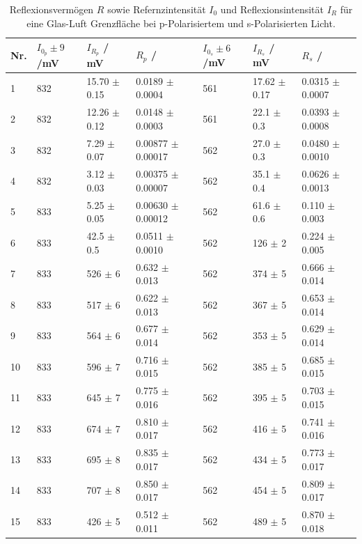 \documentclass[12pt,a4paper,twoside]{article}
\begin{document}
\begin{table}[H]
    \centering
    \caption{Reflexionsvermögen $R$ sowie Refernzintensität $I_0$ und Reflexionsintensität $I_R$ für eine Glas-Luft Grenzfläche bei p-Polarisiertem und s-Polarisierten Licht.}
    \label{tab:reflexionsvermögen glas luft}
    \begin{tabular}{| l | l | l | l | l | l | l |}
        \hline
        Nr. & $I_{0_p} \pm 9$/mV & $I_{R_p}$ / mV & $R_p$ /  & $I_{0_s} \pm 6$/mV & $I_{R_s}$ / mV & $R_s$ / \\
        \hline
        1  & 832  & 15.70 $\pm$ 0.15    & 0.0189      $\pm$ 0.0004     & 561 & 17.62   $\pm$ 0.17  & 0.0315  $\pm$ 0.0007 \\
        2  & 832  & 12.26 $\pm$ 0.12    & 0.0148      $\pm$ 0.0003     & 561 & 22.1    $\pm$ 0.3   & 0.0393  $\pm$ 0.0008 \\
        3  & 832  & 7.29  $\pm$ 0.07    & 0.00877     $\pm$ 0.00017    & 562 & 27.0    $\pm$ 0.3   & 0.0480  $\pm$ 0.0010 \\
        4  & 832  & 3.12  $\pm$ 0.03    & 0.00375     $\pm$ 0.00007    & 562 & 35.1    $\pm$ 0.4   & 0.0626  $\pm$ 0.0013 \\
        5  & 833  & 5.25  $\pm$ 0.05    & 0.00630     $\pm$ 0.00012    & 562 & 61.6    $\pm$ 0.6   & 0.110   $\pm$ 0.003  \\
        6  & 833  & 42.5  $\pm$ 0.5     & 0.0511      $\pm$ 0.0010     & 562 & 126     $\pm$ 2     & 0.224   $\pm$ 0.005  \\
        7  & 833  & 526   $\pm$ 6       & 0.632       $\pm$ 0.013      & 562 & 374     $\pm$ 5     & 0.666   $\pm$ 0.014  \\
        8  & 833  & 517   $\pm$ 6       & 0.622       $\pm$ 0.013      & 562 & 367     $\pm$ 5     & 0.653   $\pm$ 0.014  \\
        9  & 833  & 564   $\pm$ 6       & 0.677       $\pm$ 0.014      & 562 & 353     $\pm$ 5     & 0.629   $\pm$ 0.014  \\
        10 & 833  & 596   $\pm$ 7       & 0.716       $\pm$ 0.015      & 562 & 385     $\pm$ 5     & 0.685   $\pm$ 0.015  \\
        11 & 833  & 645   $\pm$ 7       & 0.775       $\pm$ 0.016      & 562 & 395     $\pm$ 5     & 0.703   $\pm$ 0.015  \\
        12 & 833  & 674   $\pm$ 7       & 0.810       $\pm$ 0.017      & 562 & 416     $\pm$ 5     & 0.741   $\pm$ 0.016  \\
        13 & 833  & 695   $\pm$ 8       & 0.835       $\pm$ 0.017      & 562 & 434     $\pm$ 5     & 0.773   $\pm$ 0.017  \\
        14 & 833  & 707   $\pm$ 8       & 0.850       $\pm$ 0.017      & 562 & 454     $\pm$ 5     & 0.809   $\pm$ 0.017  \\
        15 & 833  & 426   $\pm$ 5       & 0.512       $\pm$ 0.011      & 562 & 489     $\pm$ 5     & 0.870   $\pm$ 0.018  \\
        \hline
    \end{tabular}
\end{table}
\end{document}

